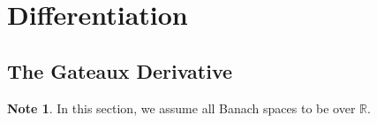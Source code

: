 \documentclass[12pt]{amsart}
\theoremstyle{definition}
\newtheorem{defn}[definition]{Definition}
\newtheorem{note}[definition]{Note}
\newcommand{\del}{\delta}
\newcommand{\N}{\mathbb{N}}
\newcommand{\R}{\mathbb{R}}
\newcommand{\ld}[1]{\label{defn:#1}}
\begin{document}
%
%


	
	
	
	
	
	
	
	
	
	
	
	
	
	\newpage
	\section{Differentiation}
	
	\subsection{The Gateaux Derivative}
	
	\begin{note}
	In this section, we assume all Banach spaces to be over $\R$. 
	\end{note}
	
\end{document}

